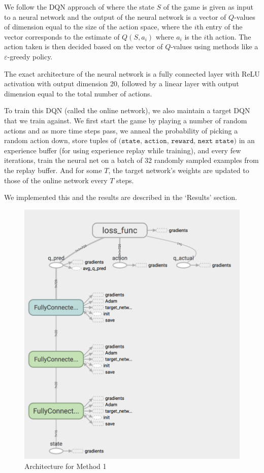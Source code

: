 \documentclass{article}
\begin{document}
We follow the DQN approach of \cite{mnih2013playing}
where the state $S$ of the game is given as input to a
neural network and the output of the neural network
is a vector of $Q$-values of dimension equal to the
size of the action space, where the $i$th entry of the
vector corresponds to the estimate of $Q(S,a_i)$ where $a_i$
is the $i$th action. The action taken is then decided
based on the vector of $Q$-values using methods like
a $\varepsilon$-greedy policy.

The exact architecture of the neural network is
a fully connected layer with ReLU activation
with output dimension 20, followed by
a linear layer with output dimension
equal to the total number of actions.

To train this DQN (called the online network), we also maintain
a target DQN that we train against. We first start the game
by playing a number of random actions and as
more time steps pass, we anneal the
probability of picking a random action down,
store tuples of
$\texttt{(state, action, reward, next state)}$
in an experience buffer (for using experience
replay while training), and every few iterations,
train the neural net on a batch of 32 randomly
sampled examples from the replay buffer. And
for some $T$, the target network's weights
are updated to those of the online network every
$T$ steps.

We implemented this and the results are described in
the `Results' section.


\begin{figure}[H]
\centering
\includegraphics[scale=0.15]{naive_single.png}
\caption{Architecture for Method 1}
\end{figure}
\end{document}
